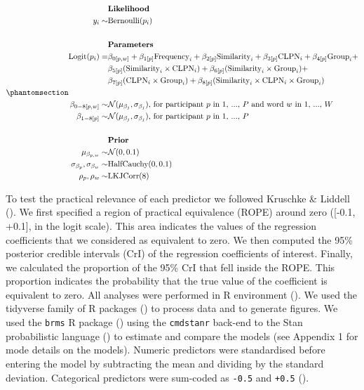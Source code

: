 \documentclass[
]{article}
\begin{document}
\begin{equation}\phantomsection\label{eq-1}{
\begin{aligned}
&\textbf{Likelihood}  \\
y_{i} \sim & \text{Bernoulli}(p_{i}) \\ \\
&\textbf{Parameters}  \\
\text{Logit}(p_{i}) = &  \beta_{0[p,w]} + \beta_{1[p]} \text{Frequency}_{i} + \beta_{2[p]} \text{Similarity}_i +  \beta_{3[p]} \text{CLPN}_i + \beta_{4[p]} \text{Group}_i + \\
&\beta_{5[p]} (\text{Similarity}_i \times \text{CLPN}_i) + \beta_{6[p]} (\text{Similarity}_i \times \text{Group}_i) + \\
& \beta_{7[p]} (\text{CLPN}_i \times \text{Group}_i) + \beta_{8[p]} (\text{Similarity}_i \times \text{CLPN}_i \times \text{Group}_i) \\ \\
\beta_{0-8[p,w]} \sim & \mathcal{N}(\mu_{\beta_{j}}, \sigma_{\beta_{j}}) \text{, for participant } p \text{ in 1, ..., } P \text{ and  word } w \text{ in 1, ..., } W \\
\beta_{1-8[p]} \sim &  \mathcal{N}(\mu_{\beta_{j}}, \sigma_{\beta_{j}}) \text{, for participant } p \text{ in 1, ..., } P \\ \\
&\textbf{Prior}  \\
\mu_{\beta_{p,w}}  \sim &  \mathcal{N}(0, 0.1) \\
\sigma_{\beta_{p}},  \sigma_{\beta_{w}} \sim & \text{HalfCauchy}(0, 0.1) \\
\rho_{p}, \rho_{w} \sim & \text{LKJCorr}(8) \\
\end{aligned}
}\end{equation}

To test the practical relevance of each predictor we followed Kruschke
\& Liddell (). We first
specified a region of practical equivalence (ROPE) around zero ({[}-0.1,
+0.1{]}, in the logit scale). This area indicates the values of the
regression coefficients that we considered as equivalent to zero. We
then computed the 95\% posterior credible intervals (CrI) of the
regression coefficients of interest. Finally, we calculated the
proportion of the 95\% CrI that fell inside the ROPE. This proportion
indicates the probability that the true value of the coefficient is
equivalent to zero. All analyses were performed in R environment
(). We used the
tidyverse family of R packages
() to process
data and to generate figures. We used the \texttt{brms} R package
() using the
\texttt{cmdstanr} back-end to the Stan probabilistic language
() to estimate
and compare the models (see Appendix 1 for mode details on the models).
Numeric predictors were standardised before entering the model by
subtracting the mean and dividing by the standard deviation. Categorical
predictors were sum-coded as \texttt{-0.5} and \texttt{+0.5}
().
\end{document}
